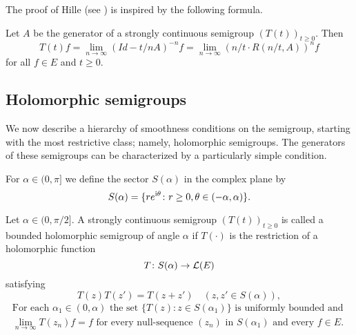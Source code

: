 The proof of Hille (see \citet{kato:1966}) is inspired by the following formula.
\begin{proposition}\label{prop:a2-1.10}
Let $A$ be the generator of a strongly continuous semigroup $(T(t))_{t \geq 0}$.
Then
\begin{equation}\label{eq:a2-1.3}
    T(t)f = \lim_{n \to \infty} (Id - t/nA)^{-n} f = \lim_{n \to \infty} (n/t \cdot R(n/t,A))^{n} f
\end{equation}
for all $f \in E$ and $t \geq 0$.
\end{proposition}
\subsection{Holomorphic semigroups} \label{subsec:a2-1.se4}

We now describe a hierarchy of smoothness conditions on the semigroup, starting with the most restrictive class; namely, holomorphic semigroups.
The generators of these semigroups can be characterized by a particularly simple condition.

For $\alpha \in (0,\pi]$ we define the sector $S(\alpha)$ in the complex plane by
\[
    S(\alpha) = \{re^{\mathrm{i}\theta} \colon r \geq 0, \theta \in (-\alpha,\alpha)\} .
\]

\begin{definition}\label{def:a2-1.11}
Let $\alpha \in (0,\pi/2]$.
A strongly continuous semigroup $(T(t))_{t \geq 0}$ is called a bounded holomorphic semigroup of angle $\alpha$ if $T(\cdot)$ is the restriction of a holomorphic function
\[
    T \colon S(\alpha) \to \mathcal{L}(E)
\]
satisfying
\begin{equation}\label{eq:a2-1.4}
    T(z)T(z') = T(z+z') \quad (z,z' \in S(\alpha)),
\end{equation}
\begin{equation}\label{eq:a2-1.5}
\begin{split}
    \text{For each } \alpha_{1} \in (0,\alpha) \text{ the set } \{T(z) \colon z \in S(\alpha_{1})\} \text{ is uniformly bounded and }\\
     \lim_{n \to \infty} T(z_{n})f = f \text{ for every null-sequence } (z_{n}) \text{ in } S(\alpha_{1}) \text{ and every } f \in E.
\end{split}     
\end{equation}
\end{definition}

